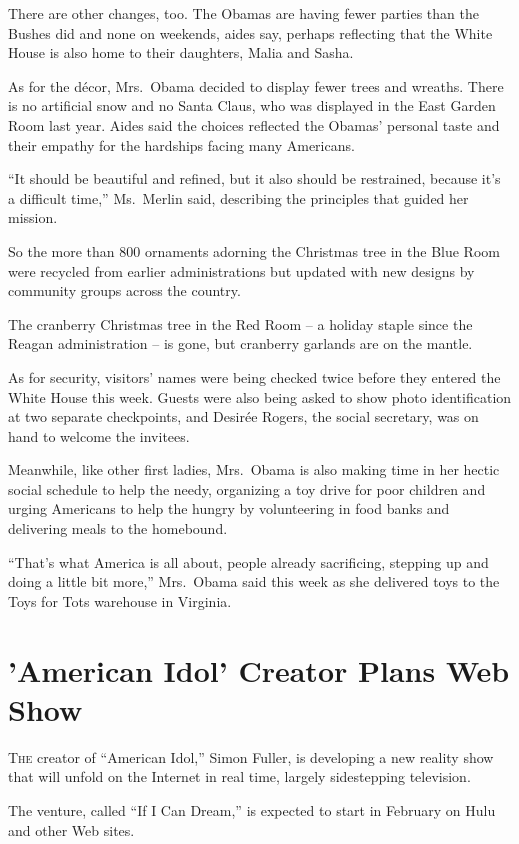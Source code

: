 ﻿\documentclass[12pt]{article}
\begin{document}
There are other changes, too. The Obamas are having fewer parties than the Bushes did and none on
weekends, aides say, perhaps reflecting that the White House is also home to their daughters, Malia
and Sasha.

As for the d\'ecor, Mrs.~Obama decided to display fewer trees and wreaths. There is no artificial
snow and no Santa Claus, who was displayed in the East Garden Room last year. Aides said the choices
reflected the Obamas' personal taste and their empathy for the hardships facing many Americans.

``It should be beautiful and refined, but it also should be restrained, because it's a difficult
time,'' Ms.~Merlin said, describing the principles that guided her mission.

So the more than 800 ornaments adorning the Christmas tree in the Blue Room were recycled from
earlier administrations but updated with new designs by community groups across the country.

The cranberry Christmas tree in the Red Room -- a holiday staple since the Reagan administration --
is gone, but cranberry garlands are on the mantle.

As for security, visitors' names were being checked twice before they entered the White House this
week. Guests were also being asked to show photo identification at two separate checkpoints, and
Desir\'ee Rogers, the social secretary, was on hand to welcome the invitees.

Meanwhile, like other first ladies, Mrs.~Obama is also making time in her hectic social schedule to
help the needy, organizing a toy drive for poor children and urging Americans to help the hungry by
volunteering in food banks and delivering meals to the homebound.

``That's what America is all about, people already sacrificing, stepping up and doing a little bit
more,'' Mrs.~Obama said this week as she delivered toys to the Toys for Tots warehouse in Virginia.

\section{'American Idol' Creator Plans Web Show}

\lettrine{T}{he} creator of ``American Idol,'' Simon Fuller, is developing a
new reality show that will unfold on the Internet in real time, largely sidestepping television.

The venture, called ``If I Can Dream,'' is expected to start in February on Hulu and other Web
sites.
\end{document}
